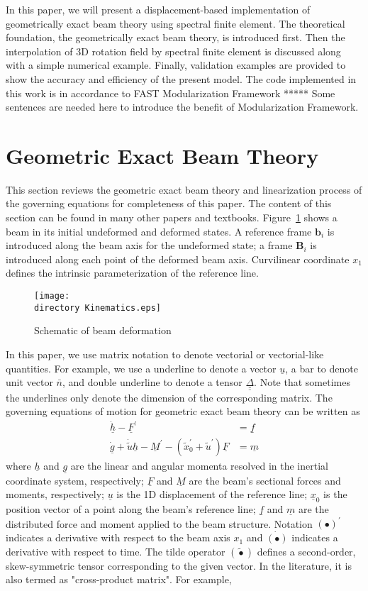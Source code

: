 \documentclass{aiaa-tc}
\def\directory{EPSF/}
\renewcommand{\vec}[1]{\underline{#1}}
\renewcommand{\skew}[1]{\widetilde{#1}}
\begin{document}
In this paper, we will present a displacement-based implementation of geometrically exact beam theory using spectral finite element. The theoretical foundation, the geometrically exact beam theory, is introduced first. Then the interpolation of 3D rotation field by spectral finite element is discussed along with a simple numerical example. Finally, validation examples are provided to show the accuracy and efficiency of the present model. The code implemented in this work is in accordance to FAST Modularization Framework ***** {\color{red} Some sentences are needed here to introduce the benefit of Modularization Framework}.  

\section{Geometric Exact Beam Theory}
This section reviews the geometric exact beam theory and linearization process of the governing equations for completeness of this paper. The content of this section can be found in many other papers and textbooks.
Figure~\ref{Kinematics} shows a beam in its initial undeformed
and deformed states. A reference frame $\mathbf{b}_i$ is introduced along the
beam axis for the undeformed state; a frame $\mathbf{B}_i$ is introduced
along each point of the deformed beam axis. Curvilinear coordinate $x_1$ defines the intrinsic parameterization of the reference line.
\begin{figure}
\centering
\texttt{[image: \\directory Kinematics.eps]}
\caption{Schematic of beam deformation} \label{Kinematics}
\end{figure}
In this paper, we use matrix notation to denote vectorial or vectorial-like quantities. For example, we use a underline to denote a vector $\underline{u}$, a bar to denote unit vector $\bar{n}$, and double underline to denote a tensor $\underline{\underline{\Delta}}$. Note that sometimes the underlines only denote the dimension of the corresponding matrix. The governing equations of motion for geometric exact beam theory can be written as \cite{Bauchau:2010}
\begin{align}
	\label{GovernGEBT-1}
	\dot{\underline{h}} - \underline{F}^\prime &= \underline{f} \\
	\label{GovernGEBT-2}
	\dot{\underline{g}} + \dot{\tilde{u}} \underline{h} - \underline{M}^\prime - (\tilde{x}_0^\prime + \tilde{u}^\prime) \underline{F} &= \underline{m}
\end{align}
where $\vec{h}$ and $\vec{g}$ are the linear and angular momenta resolved in the inertial coordinate system, respectively; $\vec{F}$ and $\vec{M}$ are the beam's sectional forces and moments, respectively; $\vec{u}$ is the 1D displacement of the reference line; $\vec{x}_0$ is the position vector of a point along the beam's reference line; $\vec{f}$ and $\vec{m}$ are the distributed force and moment applied to the beam structure.  Notation $(\bullet)^\prime$ indicates a derivative with respect to the beam axis $x_1$ and $\dot{(\bullet)}$ indicates a derivative with respect to time. The tilde operator $(\skew{\bullet})$ defines a second-order, skew-symmetric tensor corresponding to the given vector. In the literature, it is also termed as "cross-product matrix". For example,
\end{document}
